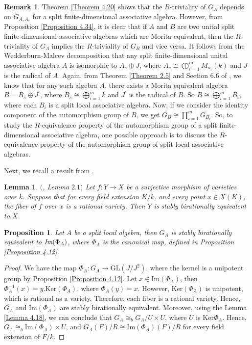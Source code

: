 \documentclass[12pt]{amsart}
\newtheorem{lemma}[theorem]{Lemma}
\newtheorem{proposition}[theorem]{Proposition}
\theoremstyle{definition}
\newtheorem{remark}[theorem]{Remark}
\numberwithin{equation}{section}
\begin{document}
\vskip2mm
\begin{remark}\label{Remark 4.35}
Theorem \ref{Theorem 4.20} shows that the $R$-triviality of $G_A$ depends on $G_{A, A_s}$ for a split finite-dimensional associative algebra. However, from Proposition \ref{Proposition 4.34}, it is clear that if $A$ and $B$ are two unital split finite-dimensional associative algebras which are Morita equivalent, then the $R$-triviality of $G_{A}$ implies the $R$-triviality of $G_{B}$ and vice versa. It follows from the Wedderburn-Malcev decomposition that any split finite-dimensional unital associative algebra $A$ is isomorphic to $A_s \oplus J$, where $A_s \cong \bigoplus_{i=1}^{m}M_{n_{i}}(k)$ and $J$ is the radical of $A$. Again, from Theorem \ref{Theorem 2.5} and Section $6.6$ of \cite{Pierce}, we know that for any such algebra $A$, there exists a Morita equivalent algebra $B=B_s\oplus J^{\prime}$, where $B_s\cong \bigoplus_{i=1}^{m} k$ and $J^{\prime}$ is the radical of $B$. So $B\cong \bigoplus_{i=1}^{m} B_i$, where each $B_i$ is a split local associative algebra. Now, if we consider the identity component of the automorphism group of $B$, we get $G_B\cong\prod_{i=1}^{m} G_{B_{i}}$. So, to study the $R$-equivalence property of the automorphism group of a split finite-dimensional associative algebra, one possible approach is to discuss the $R$-equivalence property of the automorphism group of split local associative algebras.
\end{remark}
\vskip2mm 
\noindent 
Next, we recall a result from \cite{Merkurjev}.
\vskip2mm

\begin{lemma}\label{Lemma 4.36}$($\cite{Merkurjev}, \emph{Lemma} $2.1)$
Let $f: Y\rightarrow X$ be a surjective morphism of varieties over $k$. Suppose that for every field extension $K/k$, and every point $x\in X(K)$, the fiber of $f$ over $x$ is a rational variety. Then $Y$ is stably birationally equivalent to $X$.
\end{lemma}
 
\vskip2mm
\begin{proposition}\label{Proposition 4.37}
Let $A$ be a split local algebra, then $G_A$ is stably birationally equivalent to $\emph{\text{Im}}(\Phi_A)$, where $\Phi_A$ is the canonical map, defined in Proposition \ref{Proposition 4.12}.
\end{proposition}
\vskip1mm
\begin{proof}
We have the map $\Phi_A: G_A\rightarrow \text{GL}(J/J^2)$, where the kernel is a unipotent group by Proposition \ref{Proposition 4.12}. Let $x\in \text{Im}(\Phi_A)$, then $\Phi_{A}^{-1}(x)=y.\text{Ker}(\Phi_A)$, where $\Phi_A(y)=x$. However, $\text{Ker}(\Phi_A)$ is unipotent, which is rational as a variety. Therefore, each fiber is a rational variety. Hence, $G_A$ and $\text{Im}(\Phi_A)$ are stably birationally equivalent. Moreover, using the Lemma \ref{Lemma 4.18}, we can conclude that $G_A\cong_b G_A/U\times U$, where $U$ is $\text{Ker}\Phi_A$. Hence, $G_A\cong_b \text{Im}(\Phi_A)\times U$, and $G_A(F)/R\cong \mathrm{Im}(\Phi_A)(F)/R$ for every field extension of $F/k$.
\end{proof}
\end{document}

